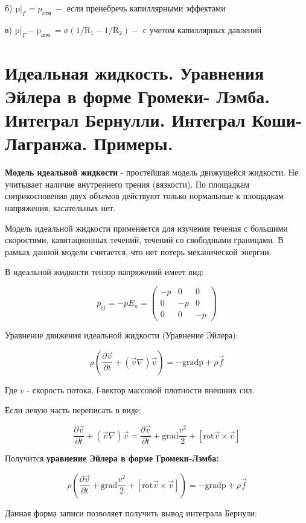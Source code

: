 б) $\left.\mathrm{p}\right|_{\Gamma}=p_{\text {aтм }}-$ если пренебречь капиллярными эффектами


в) $\left.\mathrm{p}\right|_{\Gamma}-\mathrm{p}_{\text {атм }}=\sigma\left(1 / \mathrm{R}_1-1 / \mathrm{R}_2\right)-$ с учетом капиллярных давлений


\section{Идеальная жидкость. Уравнения Эйлера в форме Громеки- Лэмба. Интеграл Бернулли. Интеграл Коши-Лагранжа. Примеры.}

\textbf{Модель идеальной жидкости} - простейшая модель движущейся жидкости. Не учитывает наличие внутреннего трения (вязкости). По площадкам соприкосновения двух объемов действуют только нормальные к площадкам напряжения, касательных нет.

Модель идеальной жидкости применяется для изучения течения с большими скоростями, кавитационных течений, течений со свободными границами. В рамках данной модели считается, что нет потерь механической энергии.

В идеальной жидкости тензор напряжений имеет вид:

$$
p_{i j}=-p E_{n}=\left(\begin{array}{ccc} 
-p & 0 & 0 \\
0 & -p & 0 \\
0 & 0 & -p
\end{array} \right)
$$

Уравнение движения идеальной жидкости (Уравнение Эйлера):

$$
\rho\left(\frac{\partial \vec{v}}{\partial t}+(\vec{v} \nabla) \vec{v}\right)=-\mathrm{gradp}+\rho \vec{f}
$$

Где $v$ - скорость потока, f-вектор массовой плотности внешних сил.

Если левую часть переписать в виде:

$$
\frac{\partial \vec{v}}{\partial t}+(\vec{v} \nabla) \vec{v}=\frac{\partial \vec{v}}{\partial t}+\mathrm{grad} \frac{v^{2}}{2}+[\mathrm{rot} \vec{v} \times \vec{v}]
$$

Получится \textbf{уравнение Эйлера в форме Громеки-Лэмба:}

$$
\rho\left(\frac{\partial \vec{v}}{\partial t}+\mathrm{grad} \frac{v^{2}}{2}+[\mathrm{rot} \vec{v} \times \vec{v}]\right)=-\mathrm{gradp}+\rho \vec{f}
$$

Данная форма записи позволяет получить вывод интеграла Бернули:


